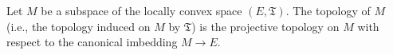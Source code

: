 Let $M$ be a subspace of the locally convex space $(E, \mathfrak{T})$. The topology of $M$ (i.e., the topology induced on $M$ by $\mathfrak{T}$) is the projective topology on $M$ with respect to the canonical imbedding $M \rightarrow E$.
